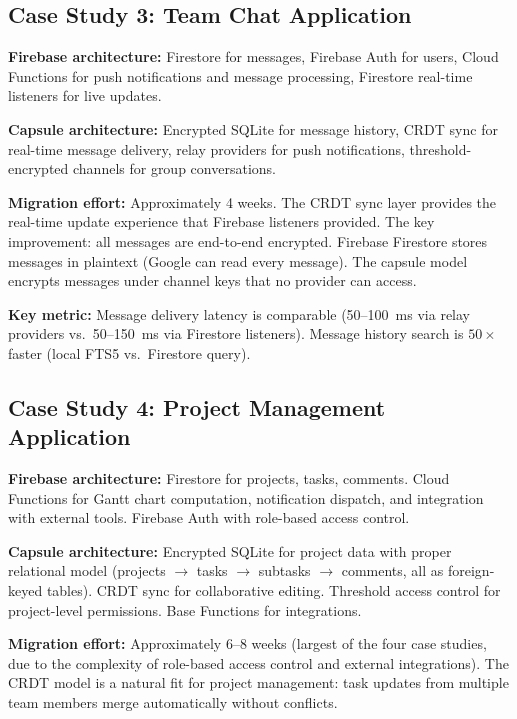 \documentclass[11pt,a4paper]{article}
\begin{document}
\subsection{Case Study 3: Team Chat Application}

\textbf{Firebase architecture:} Firestore for messages, Firebase Auth
for users, Cloud Functions for push notifications and message
processing, Firestore real-time listeners for live updates.

\textbf{Capsule architecture:} Encrypted SQLite for message history,
CRDT sync for real-time message delivery, relay providers for push
notifications, threshold-encrypted channels for group conversations.

\textbf{Migration effort:} Approximately 4 weeks. The CRDT sync layer
provides the real-time update experience that Firebase listeners provided.
The key improvement: all messages are end-to-end encrypted. Firebase
Firestore stores messages in plaintext (Google can read every message).
The capsule model encrypts messages under channel keys that no provider
can access.

\textbf{Key metric:} Message delivery latency is comparable (50--100~ms
via relay providers vs.\ 50--150~ms via Firestore listeners). Message
history search is $50\times$ faster (local FTS5 vs.\ Firestore query).

\subsection{Case Study 4: Project Management Application}

\textbf{Firebase architecture:} Firestore for projects, tasks, comments.
Cloud Functions for Gantt chart computation, notification dispatch,
and integration with external tools. Firebase Auth with role-based
access control.

\textbf{Capsule architecture:} Encrypted SQLite for project data with
proper relational model (projects $\to$ tasks $\to$ subtasks $\to$ comments,
all as foreign-keyed tables). CRDT sync for collaborative editing.
Threshold access control for project-level permissions. Base Functions
for integrations.

\textbf{Migration effort:} Approximately 6--8 weeks (largest of the four
case studies, due to the complexity of role-based access control and
external integrations). The CRDT model is a natural fit for project
management: task updates from multiple team members merge automatically
without conflicts.
\end{document}
